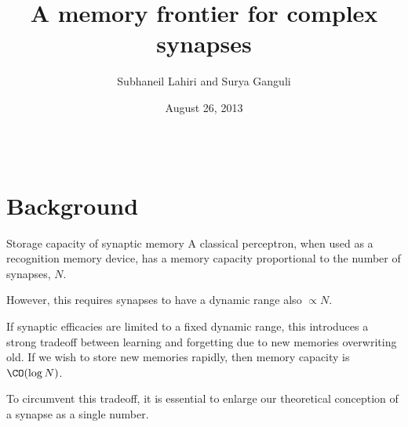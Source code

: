 \documentclass[final,hyperref={pdfpagelabels=false,bookmarks=false}]{beamer}
\title{A memory frontier for complex synapses}
\author{Subhaneil Lahiri and Surya Ganguli}
\institute[Stanford]{%
Department of Applied Physics, Stanford University, Stanford CA
}
\date{August 26, 2013}
\begin{document}
\begin{frame}{}

\begin{columns}[t]


\begin{column}{0.26\linewidth}

\section{Background}


\begin{block}{Storage capacity of synaptic memory}
%
%
 A classical perceptron, when used as a recognition memory device, has a memory capacity proportional to the number of synapses, $N$.

 \vp However, this requires synapses to have a dynamic range also $\propto N$.
 
 \vp If synaptic efficacies are limited to a fixed dynamic range, this introduces a strong tradeoff between learning and forgetting due to new memories overwriting old.
 If we wish to store new memories rapidly, then memory capacity is $\CO(\log N)$.
 \\ 

 \vp To circumvent this tradeoff, it is essential to enlarge our theoretical conception of a synapse as a single number.
\end{block}



\end{column}
\end{columns}
\end{frame}
\end{document}
